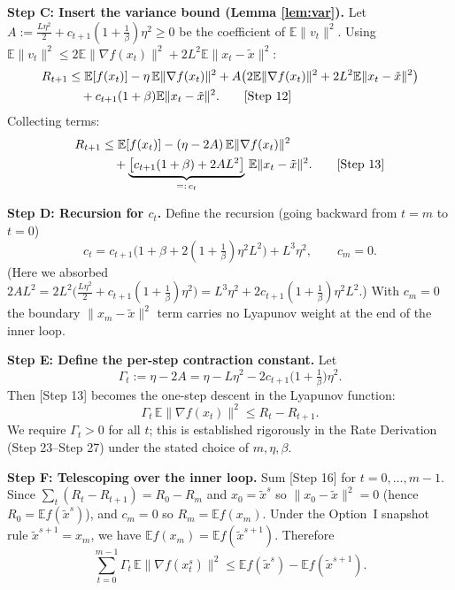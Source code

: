 \documentclass[11pt]{article}
\begin{document}
\textbf{Step C: Insert the variance bound (Lemma \ref{lem:var}).}
Let $A:=\frac{L\eta^2}{2} + c_{t+1}(1+\tfrac1\beta)\eta^2 \ge 0$ be the coefficient of
$\mathbb{E}\|v_t\|^2$. Using
$\mathbb{E}\|v_t\|^2 \le 2\mathbb{E}\|\nabla f(x_t)\|^2 + 2L^2 \mathbb{E}\|x_t-\tilde{x}\|^2$:
\begin{align}
R_{t+1} &\le \mathbb{E}[f(x_t)] - \eta\,\mathbb{E}\|\nabla f(x_t)\|^2
+ A\big(2\mathbb{E}\|\nabla f(x_t)\|^2 + 2L^2\mathbb{E}\|x_t-\tilde{x}\|^2\big)\notag\\
&\quad + c_{t+1}(1+\beta)\mathbb{E}\|x_t-\tilde{x}\|^2.
\tag*{[Step 12]}
\end{align}
Collecting terms:
\begin{align}
R_{t+1} &\le \mathbb{E}[f(x_t)] - (\eta - 2A)\,\mathbb{E}\|\nabla f(x_t)\|^2 \notag\\
&\quad + \underbrace{\big[c_{t+1}(1+\beta) + 2A L^2\big]}_{=:\,c_t}\,\mathbb{E}\|x_t-\tilde{x}\|^2.
\tag*{[Step 13]}
\end{align}

\textbf{Step D: Recursion for $c_t$.}
Define the recursion (going backward from $t=m$ to $t=0$)
\[
c_t = c_{t+1}\Big(1+\beta + 2(1+\tfrac1\beta)\eta^2 L^2\Big) + L^3\eta^2,
\qquad c_m = 0.
\tag*{[Step 14]}
\]
(Here we absorbed $2A L^2 = 2L^2\big(\frac{L\eta^2}{2}+c_{t+1}(1+\frac1\beta)\eta^2\big)
= L^3\eta^2 + 2c_{t+1}(1+\frac1\beta)\eta^2 L^2$.) With $c_m=0$ the boundary
$\|x_m-\tilde{x}\|^2$ term carries no Lyapunov weight at the end of the inner loop.

\textbf{Step E: Define the per-step contraction constant.}
Let
\[
\Gamma_t := \eta - 2A = \eta - L\eta^2 - 2c_{t+1}\Big(1+\tfrac1\beta\Big)\eta^2.
\tag*{[Step 15]}
\]
Then [Step 13] becomes the one-step descent in the Lyapunov function:
\[
\Gamma_t\,\mathbb{E}\|\nabla f(x_t)\|^2 \le R_t - R_{t+1}.
\tag*{[Step 16]}
\]
We require $\Gamma_t > 0$ for all $t$; this is established rigorously in the Rate
Derivation (Step 23--Step 27) under the stated choice of $m,\eta,\beta$.

\textbf{Step F: Telescoping over the inner loop.}
Sum [Step 16] for $t=0,\dots,m-1$. Since $\sum_t (R_t - R_{t+1}) = R_0 - R_m$ and
$x_0 = \tilde{x}^s$ so $\|x_0-\tilde{x}\|^2 = 0$ (hence $R_0 = \mathbb{E}f(\tilde{x}^s)$),
and $c_m=0$ so $R_m = \mathbb{E}f(x_m)$. Under the Option~I snapshot rule
$\tilde{x}^{s+1}=x_m$, we have $\mathbb{E}f(x_m)=\mathbb{E}f(\tilde{x}^{s+1})$. Therefore
\[
\sum_{t=0}^{m-1} \Gamma_t\,\mathbb{E}\|\nabla f(x_t^s)\|^2
\le \mathbb{E}f(\tilde{x}^s) - \mathbb{E}f(\tilde{x}^{s+1}).
\tag*{[Step 17]}
\]
\end{document}
